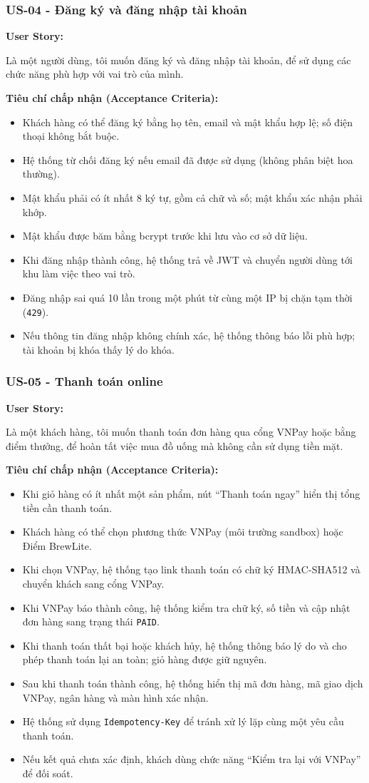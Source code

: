 \documentclass[12pt,a4paper]{article}
\newcommand{\userstory}[2]{%
  \noindent\textbf{User Story:}\par
  #1\par
  \hspace*{\parindent}\textbf{Tiêu chí chấp nhận (Acceptance Criteria):}
  \begin{itemize}
    #2
  \end{itemize}}
\begin{document}
\subsubsection{US-04 - Đăng ký và đăng nhập tài khoản}
\userstory{Là một người dùng, tôi muốn đăng ký và đăng nhập tài khoản, để sử dụng các chức năng phù hợp với vai trò của mình.}{
  \item Khách hàng có thể đăng ký bằng họ tên, email và mật khẩu hợp lệ; số điện thoại không bắt buộc.
  \item Hệ thống từ chối đăng ký nếu email đã được sử dụng (không phân biệt hoa thường).
  \item Mật khẩu phải có ít nhất 8 ký tự, gồm cả chữ và số; mật khẩu xác nhận phải khớp.
  \item Mật khẩu được băm bằng bcrypt trước khi lưu vào cơ sở dữ liệu.
  \item Khi đăng nhập thành công, hệ thống trả về JWT và chuyển người dùng tới khu làm việc theo vai trò.
  \item Đăng nhập sai quá 10 lần trong một phút từ cùng một IP bị chặn tạm thời (\texttt{429}).
  \item Nếu thông tin đăng nhập không chính xác, hệ thống thông báo lỗi phù hợp; tài khoản bị khóa thấy lý do khóa.
}

\subsubsection{US-05 - Thanh toán online}
\userstory{Là một khách hàng, tôi muốn thanh toán đơn hàng qua cổng VNPay hoặc bằng điểm thưởng, để hoàn tất việc mua đồ uống mà không cần sử dụng tiền mặt.}{
  \item Khi giỏ hàng có ít nhất một sản phẩm, nút ``Thanh toán ngay'' hiển thị tổng tiền cần thanh toán.
  \item Khách hàng có thể chọn phương thức VNPay (môi trường sandbox) hoặc Điểm BrewLite.
  \item Khi chọn VNPay, hệ thống tạo link thanh toán có chữ ký HMAC-SHA512 và chuyển khách sang cổng VNPay.
  \item Khi VNPay báo thành công, hệ thống kiểm tra chữ ký, số tiền và cập nhật đơn hàng sang trạng thái \texttt{PAID}.
  \item Khi thanh toán thất bại hoặc khách hủy, hệ thống thông báo lý do và cho phép thanh toán lại an toàn; giỏ hàng được giữ nguyên.
  \item Sau khi thanh toán thành công, hệ thống hiển thị mã đơn hàng, mã giao dịch VNPay, ngân hàng và màn hình xác nhận.
  \item Hệ thống sử dụng \texttt{Idempotency-Key} để tránh xử lý lặp cùng một yêu cầu thanh toán.
  \item Nếu kết quả chưa xác định, khách dùng chức năng ``Kiểm tra lại với VNPay'' để đối soát.
}
\end{document}
